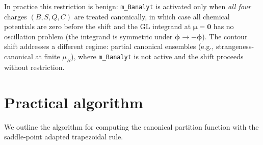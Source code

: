 \documentclass[11pt,a4paper]{article}
\newcommand{\bphi}{\bm{\phi}}
\begin{document}
In practice this restriction is benign: \texttt{m\_Banalyt} is activated only when \emph{all four} charges $(B, S, Q, C)$ are treated canonically, in which case all chemical potentials are zero before the shift and the GL integrand at $\bm{\mu} = \bm{0}$ has no oscillation problem (the integrand is symmetric under $\bphi \to -\bphi$).
The contour shift addresses a different regime: partial canonical ensembles (e.g., strangeness-canonical at finite $\mu_B$), where \texttt{m\_Banalyt} is not active and the shift proceeds without restriction.


\section{Practical algorithm}
\label{sec:algorithm}

We outline the algorithm for computing the canonical partition function with the saddle-point adapted trapezoidal rule.
\end{document}
